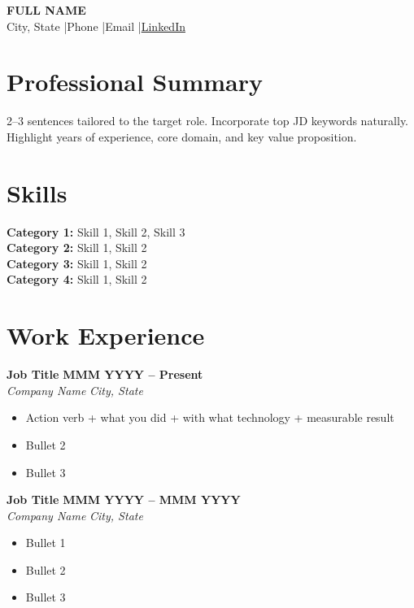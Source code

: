 \documentclass[11pt,a4paper]{article}
\begin{document}
\begin{center}
    {\LARGE\bfseries FULL NAME} \\[4pt]
    City, State \enspace|\enspace Phone \enspace|\enspace Email \enspace|\enspace \href{https://linkedin.com/in/yourprofile}{LinkedIn}
\end{center}

\section{Professional Summary}
2--3 sentences tailored to the target role. Incorporate top JD keywords naturally. Highlight years of experience, core domain, and key value proposition.

\section{Skills}
\textbf{Category 1:} Skill 1, Skill 2, Skill 3 \\
\textbf{Category 2:} Skill 1, Skill 2 \\
\textbf{Category 3:} Skill 1, Skill 2 \\
\textbf{Category 4:} Skill 1, Skill 2

\section{Work Experience}

\textbf{Job Title} \hfill \textbf{MMM YYYY -- Present} \\
\textit{Company Name} \hfill \textit{City, State}
\begin{itemize}
    \item Action verb + what you did + with what technology + measurable result
    \item Bullet 2
    \item Bullet 3
\end{itemize}

\textbf{Job Title} \hfill \textbf{MMM YYYY -- MMM YYYY} \\
\textit{Company Name} \hfill \textit{City, State}
\begin{itemize}
    \item Bullet 1
    \item Bullet 2
    \item Bullet 3
\end{itemize}

\end{document}
